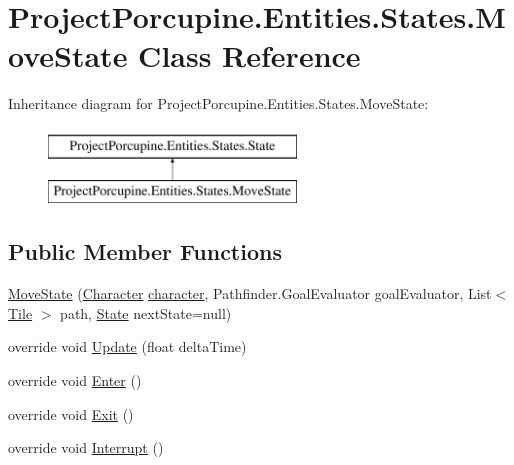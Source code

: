 \hypertarget{class_project_porcupine_1_1_entities_1_1_states_1_1_move_state}{}\section{Project\+Porcupine.\+Entities.\+States.\+Move\+State Class Reference}
\label{class_project_porcupine_1_1_entities_1_1_states_1_1_move_state}
Inheritance diagram for Project\+Porcupine.\+Entities.\+States.\+Move\+State\+:\begin{figure}[H]
\begin{center}
\leavevmode
\includegraphics[height=2.000000cm]{class_project_porcupine_1_1_entities_1_1_states_1_1_move_state}
\end{center}
\end{figure}
\subsection*{Public Member Functions}
\begin{DoxyCompactItemize}
\item 
\hyperlink{class_project_porcupine_1_1_entities_1_1_states_1_1_move_state_aeb21b229e65cb74478adb2dd3fe38ec1}{Move\+State} (\hyperlink{class_project_porcupine_1_1_entities_1_1_character}{Character} \hyperlink{class_project_porcupine_1_1_entities_1_1_states_1_1_state_a0647dd5dacc8fba22b1c462c954180c7}{character}, Pathfinder.\+Goal\+Evaluator goal\+Evaluator, List$<$ \hyperlink{class_tile}{Tile} $>$ path, \hyperlink{class_project_porcupine_1_1_entities_1_1_states_1_1_state}{State} next\+State=null)
\item 
override void \hyperlink{class_project_porcupine_1_1_entities_1_1_states_1_1_move_state_ab808623899b7a874f6bf6689ebca7def}{Update} (float delta\+Time)
\item 
override void \hyperlink{class_project_porcupine_1_1_entities_1_1_states_1_1_move_state_ae2cbe17dbccd0db23e01f7734a0f7b8f}{Enter} ()
\item 
override void \hyperlink{class_project_porcupine_1_1_entities_1_1_states_1_1_move_state_a5b379c83e83f2db29c338f0babc3994e}{Exit} ()
\item 
override void \hyperlink{class_project_porcupine_1_1_entities_1_1_states_1_1_move_state_a875221e1914193146fc96d1fc5a3ac59}{Interrupt} ()
\end{DoxyCompactItemize}
